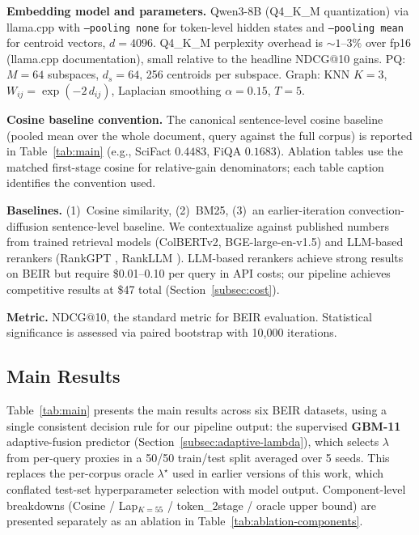 \documentclass[review,1p]{elsarticle}
\begin{document}
\textbf{Embedding model and parameters.} Qwen3-8B (Q4\_K\_M quantization) via llama.cpp with \texttt{--pooling none} for token-level hidden states and \texttt{--pooling mean} for centroid vectors, $d = 4096$. Q4\_K\_M perplexity overhead is $\sim 1$--$3\%$ over fp16 (llama.cpp documentation), small relative to the headline NDCG@10 gains. PQ: $M = 64$ subspaces, $d_s = 64$, 256 centroids per subspace. Graph: KNN $K = 3$, $W_{ij} = \exp(-2\, d_{ij})$, Laplacian smoothing $\alpha = 0.15$, $T = 5$.

\textbf{Cosine baseline convention.} The canonical sentence-level cosine baseline (pooled mean over the whole document, query against the full corpus) is reported in Table~\ref{tab:main} (e.g., SciFact $0.4483$, FiQA $0.1683$). Ablation tables use the matched first-stage cosine for relative-gain denominators; each table caption identifies the convention used.

\textbf{Baselines.} (1)~Cosine similarity, (2)~BM25, (3)~an earlier-iteration convection-diffusion sentence-level baseline. We contextualize against published numbers from trained retrieval models (ColBERTv2, BGE-large-en-v1.5) and LLM-based rerankers (RankGPT \citep{sun2024rankgpt}, RankLLM \citep{pradeep2025rankllm}). LLM-based rerankers achieve strong results on BEIR but require \$0.01--0.10 per query in API costs; our pipeline achieves competitive results at \$47 total (Section~\ref{subsec:cost}).

\textbf{Metric.} NDCG@10, the standard metric for BEIR evaluation. Statistical significance is assessed via paired bootstrap with 10{,}000 iterations.

\subsection{Main Results}
\label{subsec:main-results}

Table~\ref{tab:main} presents the main results across six BEIR datasets, using a single consistent decision rule for our pipeline output: the supervised \textbf{GBM-11} adaptive-fusion predictor (Section~\ref{subsec:adaptive-lambda}), which selects $\lambda$ from per-query proxies in a 50/50 train/test split averaged over 5 seeds. This replaces the per-corpus oracle $\lambda^\star$ used in earlier versions of this work, which conflated test-set hyperparameter selection with model output. Component-level breakdowns (Cosine / Lap$_{K=55}$ / token\_2stage / oracle upper bound) are presented separately as an ablation in Table~\ref{tab:ablation-components}.
\end{document}
